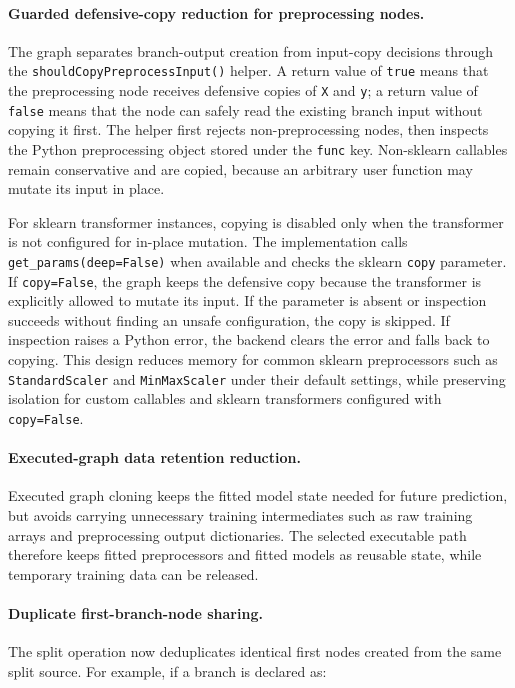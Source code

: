 \documentclass[11pt,a4paper]{article}
\begin{document}
\paragraph{Guarded defensive-copy reduction for preprocessing nodes.}
The graph separates branch-output creation from input-copy decisions through
the \texttt{shouldCopyPreprocessInput()} helper. A return value of
\texttt{true} means that the preprocessing node receives defensive copies of
\texttt{X} and \texttt{y}; a return value of \texttt{false} means that the node
can safely read the existing branch input without copying it first. The helper
first rejects non-preprocessing nodes, then inspects the Python preprocessing
object stored under the \texttt{func} key. Non-sklearn callables remain
conservative and are copied, because an arbitrary user function may mutate its
input in place.

For sklearn transformer instances, copying is disabled only when the
transformer is not configured for in-place mutation. The implementation calls
\texttt{get\_params(deep=False)} when available and checks the sklearn
\texttt{copy} parameter. If \texttt{copy=False}, the graph keeps the defensive
copy because the transformer is explicitly allowed to mutate its input. If the
parameter is absent or inspection succeeds without finding an unsafe
configuration, the copy is skipped. If inspection raises a Python error, the
backend clears the error and falls back to copying. This design reduces memory
for common sklearn preprocessors such as \texttt{StandardScaler} and
\texttt{MinMaxScaler} under their default settings, while preserving isolation
for custom callables and sklearn transformers configured with
\texttt{copy=False}.

\paragraph{Executed-graph data retention reduction.}
Executed graph cloning keeps the fitted model state needed for future
prediction, but avoids carrying unnecessary training intermediates such as raw
training arrays and preprocessing output dictionaries. The selected executable
path therefore keeps fitted preprocessors and fitted models as reusable state,
while temporary training data can be released.

\paragraph{Duplicate first-branch-node sharing.}
The split operation now deduplicates identical first nodes created from the
same split source. For example, if a branch is declared as:
\end{document}
